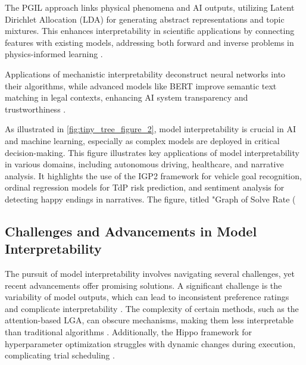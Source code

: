 The PGIL approach links physical phenomena and AI outputs, utilizing Latent Dirichlet Allocation (LDA) for generating abstract representations and topic mixtures. This enhances interpretability in scientific applications by connecting features with existing models, addressing both forward and inverse problems in physics-informed learning \cite{karniadakis2021physics,huang2022physicallyexplainablecnnsar}.

Applications of mechanistic interpretability deconstruct neural networks into their algorithms, while advanced models like BERT improve semantic text matching in legal contexts, enhancing AI system transparency and trustworthiness \cite{lin2023interpretabilityframeworksimilarcase,jucys2024interpretabilityactionexploratoryanalysis}.

As illustrated in \autoref{fig:tiny_tree_figure_2}, model interpretability is crucial in AI and machine learning, especially as complex models are deployed in critical decision-making. This figure illustrates key applications of model interpretability in various domains, including autonomous driving, healthcare, and narrative analysis. It highlights the use of the IGP2 framework for vehicle goal recognition, ordinal regression models for TdP risk prediction, and sentiment analysis for detecting happy endings in narratives. The figure, titled "Graph of Solve Rate (%


\subsection{Challenges and Advancements in Model Interpretability} \label{subsec:Challenges and Advancements in Model Interpretability}

The pursuit of model interpretability involves navigating several challenges, yet recent advancements offer promising solutions. A significant challenge is the variability of model outputs, which can lead to inconsistent preference ratings and complicate interpretability \cite{pasarkar2024cousinsvendiscorefamily}. The complexity of certain methods, such as the attention-based LGA, can obscure mechanisms, making them less interpretable than traditional algorithms \cite{lange2023discoveringattentionbasedgeneticalgorithms}. Additionally, the Hippo framework for hyperparameter optimization struggles with dynamic changes during execution, complicating trial scheduling \cite{shin2020hippotaminghyperparameteroptimization}.

